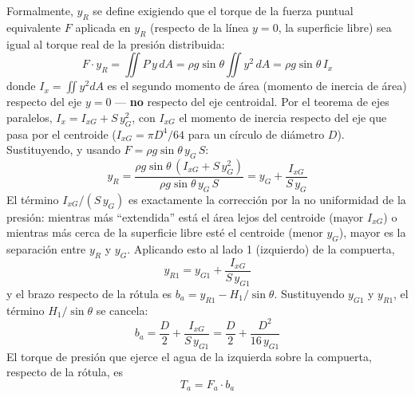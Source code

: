 \documentclass[11pt]{article}
\begin{document}
Formalmente, $y_R$ se define exigiendo que el torque de la fuerza puntual equivalente
$F$ aplicada en $y_R$ (respecto de la l\'inea $y=0$, la superficie libre) sea igual al
torque real de la presi\'on distribuida:
\begin{equation}
F\cdot y_R=\iint P\,y\,dA=\rho g\sin\theta\iint y^2\,dA=\rho g\sin\theta\,I_x
\end{equation}
donde $I_x=\iint y^2dA$ es el segundo momento de \'area (momento de inercia de \'area)
respecto del eje $y=0$ --- \textbf{no} respecto del eje centroidal. Por el teorema de
ejes paralelos, $I_x=I_{xG}+S\,y_G^2$, con $I_{xG}$ el momento de inercia respecto del
eje que pasa por el centroide ($I_{xG}=\pi D^4/64$ para un c\'irculo de di\'ametro $D$).
Sustituyendo, y usando $F=\rho g\sin\theta\,y_G\,S$:
\begin{equation}
y_R=\frac{\rho g\sin\theta\,(I_{xG}+S\,y_G^2)}{\rho g\sin\theta\,y_G\,S}
=y_G+\frac{I_{xG}}{S\,y_G}
\end{equation}
El t\'ermino $I_{xG}/(S\,y_G)$ es exactamente la correcci\'on por la no uniformidad de
la presi\'on: mientras m\'as ``extendida'' est\'a el \'area lejos del centroide (mayor
$I_{xG}$) o mientras m\'as cerca de la superficie libre est\'e el centroide (menor
$y_G$), mayor es la separaci\'on entre $y_R$ y $y_G$. Aplicando esto al lado 1
(izquierdo) de la compuerta,
\begin{equation}
y_{R1}=y_{G1}+\frac{I_{xG}}{S\,y_{G1}}
\end{equation}
y el brazo respecto de la r\'otula es $b_a=y_{R1}-H_1/\sin\theta$. Sustituyendo
$y_{G1}$ y $y_{R1}$, el t\'ermino $H_1/\sin\theta$ se cancela:
\begin{equation}
b_a=\frac D2+\frac{I_{xG}}{S\,y_{G1}}=\frac D2+\frac{D^2}{16\,y_{G1}}
\end{equation}
El torque de presi\'on que ejerce el agua de la izquierda sobre la compuerta, respecto
de la r\'otula, es
\begin{equation}
\boxed{T_a=F_a\cdot b_a}
\end{equation}
\end{document}

